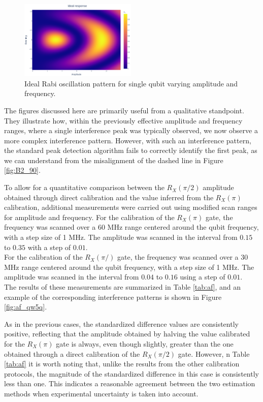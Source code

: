 \begin{figure}[h!]
    \centering
    \includegraphics[width=0.495\textwidth]{figures/png/IdealRX90.png}
    \caption{Ideal Rabi oscillation pattern for single qubit varying amplitude and frequency.}
    \label{fig:expected_RX90}
\end{figure}

The figures discussed here are primarily useful from a qualitative standpoint. 
They illustrate how, within the previously effective amplitude and frequency ranges, where a single interference peak was typically observed, we now observe a more complex interference pattern.
However, with such an interference pattern, the standard peak detection algorithm fails to correctly identify the first peak, as we can understand from the misalignment of the dashed line in Figure \ref{fig:B2_90}. 

To allow for a quantitative comparison between the $R_X(\pi/2)$ amplitude obtained through direct calibration and the value inferred from the $R_X(\pi)$ calibration, additional measurements were carried out using modified scan ranges for amplitude and frequency.
For the calibration of the $R_X(\pi)$ gate, the frequency was scanned over a 60 MHz range centered around the qubit frequency, with a step size of 1 MHz. 
The amplitude was scanned in the interval from $0.15$ to $0.35$ with a step of $0.01$.\\
For the calibration of the $R_X(\pi/)$ gate, the frequency was scanned over a 30 MHz range centered around the qubit frequency, with a step size of 1 MHz. 
The amplitude was scanned in the interval from $0.04$ to $0.16$ using a step of $0.01$.\\
The results of these measurements are summarized in Table \ref{tab:af}, and an example of the corresponding interference patterns is shown in Figure \ref{fig:af_qw5q}.

As in the previous cases, the standardized difference values are consistently positive, reflecting that the amplitude obtained by halving the value calibrated for the $R_X(\pi)$ gate is always, even though slightly, greater than the one obtained through a direct calibration of the $R_X(\pi/2)$ gate.
However, n Table \ref{tab:af} it is worth noting that, unlike the results from the other calibration protocols, the magnitude of the standardized difference in this case is consistently less than one. 
This indicates a reasonable agreement between the two estimation methods when experimental uncertainty is taken into account.

